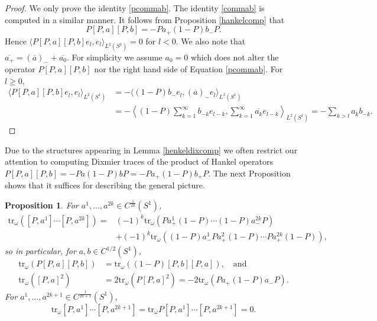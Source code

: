 \documentclass[10pt]{amsart}
\newtheorem{prop}[thm]{Proposition}
\theoremstyle{remark}
\theoremstyle{definition}
\begin{document}
\begin{proof}
We only prove the identity \eqref{pcommab}. The identity \eqref{commab} is computed in a similar manner. It follows from Proposition \ref{hankelcomp} that
$$P[P,a][P,b]=-Pa_+(1-P)b_-P.$$
Hence $\langle P[P,a][P,b]e_l,e_l\rangle_{L^2(S^1)}=0$ for $l<0$. We also note that $\overline{a_+}=(\overline{a})_-+\overline{a_0}$. For simplicity we assume $a_0=0$ which does not alter the operator $P[P,a][P,b]$ nor the right hand side of Equation \eqref{pcommab}. For $l\geq 0$,
\begin{align*}
\langle P[P,a][P,b]e_l,e_l\rangle_{L^2(S^1)}&=-\langle (1-P)b_-e_l,(\overline{a})_-e_l\rangle_{L^2(S^1)}\\
&=-\left\langle (1-P)\sum_{k=1}^\infty b_{-k}e_{l-k},\sum_{k=1}^\infty \overline{a_{k}}e_{l-k}\right\rangle_{L^2(S^1)}=-\sum_{k>l} a_{k}b_{-k}.
\end{align*}
\end{proof}

Due to the structures appearing in Lemma \ref{henkeldixcomp} we often restrict our attention to computing Dixmier traces of the product of Hankel operators $P[P,a][P,b]=-Pa(1-P)bP=-Pa_+(1-P)b_+P$. The next Proposition shows that it suffices for describing the general picture.

\begin{prop}
\label{tracexompu}
For $a^1,\ldots, a^{2k}\in C^{\frac{1}{2k}}(S^1)$,
\begin{align*}
{\mathrm{t}\mathrm{r}}_\omega ([P,a^1]\cdots [P,a^{2k}])=&(-1)^k{\mathrm{t}\mathrm{r}}_\omega(Pa_+^1(1-P)\cdots (1-P)a_-^{2k}P)\\
&+(-1)^k{\mathrm{t}\mathrm{r}}_\omega((1-P)a_-^1Pa_+^2(1-P)\cdots Pa^{2k}_+(1-P)),
\end{align*}
so in particular, for $a,b\in C^{1/2}(S^1)$,
\begin{align*}
{\mathrm{t}\mathrm{r}}_\omega(P[P,a][P,b])&={\mathrm{t}\mathrm{r}}_\omega((1-P)[P,b][P,a]),\quad\mbox{and}\\
{\mathrm{t}\mathrm{r}}_\omega([P,a]^2)&=2{\mathrm{t}\mathrm{r}}_\omega(P[P,a]^2)=-2{\mathrm{t}\mathrm{r}}_\omega(Pa_+(1-P)a_-P).
\end{align*}
For $a^1,\ldots, a^{2k+1}\in C^{\frac{1}{2k+1}}(S^1)$,
$${\mathrm{t}\mathrm{r}}_\omega [P,a^1]\cdots [P,a^{2k+1}]={\mathrm{t}\mathrm{r}}_\omega P[P,a^1]\cdots [P,a^{2k+1}]=0.$$
\end{prop}
\end{document}
